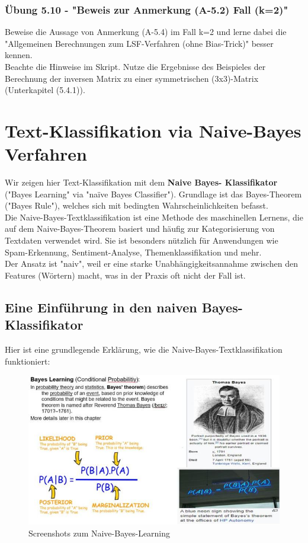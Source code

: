 \documentclass[12pt]{article}
\begin{document}
\subsubsection{Übung 5.10 - "Beweis zur Anmerkung (A-5.2) Fall (k=2)"}
%
Beweise die Aussage von Anmerkung (A-5.4) im Fall k=2 und lerne dabei die "Allgemeinen Berechnungen zum LSF-Verfahren (ohne Bias-Trick)" besser kennen. \\ Beachte die Hinweise im Skript. Nutze die Ergebnisse des Beispieles der Berechnung der inversen Matrix zu einer symmetrischen (3x3)-Matrix (Unterkapitel (5.4.1)).


\newpage

\section{Text-Klassifikation via Naive-Bayes Verfahren \\}


Wir zeigen hier Text-Klassifikation mit dem \textbf{Naive Bayes- Klassifikator} ("Bayes Learning" via "naïve Bayes Classifier"). Grundlage ist das Bayes-Theorem ("Bayes Rule"), welches sich mit bedingten Wahrscheinlichkeiten befasst.\\
Die Naive-Bayes-Textklassifikation ist eine Methode des maschinellen Lernens, die auf dem Naive-Bayes-Theorem basiert und häufig zur Kategorisierung von Textdaten verwendet wird. Sie ist besonders nützlich für Anwendungen wie Spam-Erkennung, Sentiment-Analyse, Themenklassifikation und mehr.\\

Der Ansatz ist "naiv", weil er eine starke Unabhängigkeitsannahme zwischen den Features (Wörtern) macht, was in der Praxis oft nicht der Fall ist.

\subsection{Eine Einführung in den naiven Bayes-Klassifikator}

Hier ist eine grundlegende Erklärung, wie die Naive-Bayes-Textklassifikation funktioniert:\\

\begin{figure}[htb]
  \centering
  \hspace*{-1.5cm} 
  \includegraphics[width=1.2\textwidth]{Naive-Bayes-Learning}
  \caption{Screenshots zum Naive-Bayes-Learning}
\label{fig:NB_Learning}
\end{figure}
\end{document}
